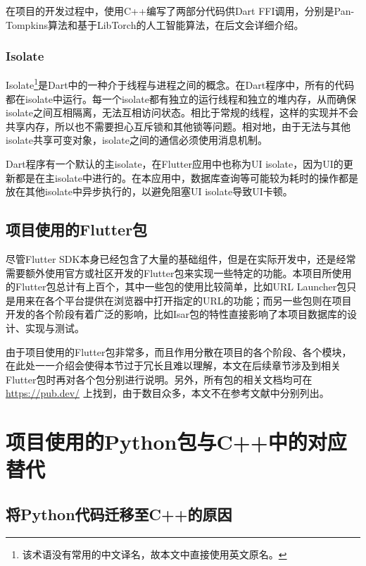 在项目的开发过程中，使用C++编写了两部分代码供Dart FFI调用，分别是Pan-Tompkins算法和基于LibTorch的人工智能算法，在后文会详细介绍。

\subsubsection{Isolate}\label{subsubsec:isolate}

Isolate\footnote{该术语没有常用的中文译名，故本文中直接使用英文原名。}是Dart中的一种介于线程与进程之间的概念。在Dart程序中，所有的代码都在isolate中运行。每一个isolate都有独立的运行线程和独立的堆内存，从而确保isolate之间互相隔离，无法互相访问状态。相比于常规的线程，这样的实现并不会共享内存，所以也不需要担心互斥锁和其他锁等问题。相对地，由于无法与其他isolate共享可变对象，isolate之间的通信必须使用消息机制。

Dart程序有一个默认的主isolate，在Flutter应用中也称为UI isolate，因为UI的更新都是在主isolate中进行的。在本应用中，数据库查询等可能较为耗时的操作都是放在其他isolate中异步执行的，以避免阻塞UI isolate导致UI卡顿。

\subsection{项目使用的Flutter包}\label{subsec:flutter-packages}

尽管Flutter SDK本身已经包含了大量的基础组件，但是在实际开发中，还是经常需要额外使用官方或社区开发的Flutter包来实现一些特定的功能。本项目所使用的Flutter包总计有上百个，其中一些包的使用比较简单，比如URL Launcher包只是用来在各个平台提供在浏览器中打开指定的URL的功能；而另一些包则在项目开发的各个阶段有着广泛的影响，比如Isar包的特性直接影响了本项目数据库的设计、实现与测试。

由于项目使用的Flutter包非常多，而且作用分散在项目的各个阶段、各个模块，在此处一一介绍会使得本节过于冗长且难以理解，本文在后续章节涉及到相关Flutter包时再对各个包分别进行说明。另外，所有包的相关文档均可在 \url{https://pub.dev/} 上找到，由于数目众多，本文不在参考文献中分别列出。


\section{项目使用的Python包与C++中的对应替代}\label{sec:python-cpp-packages}

\subsection{将Python代码迁移至C++的原因}\label{subsec:why-cpp}

